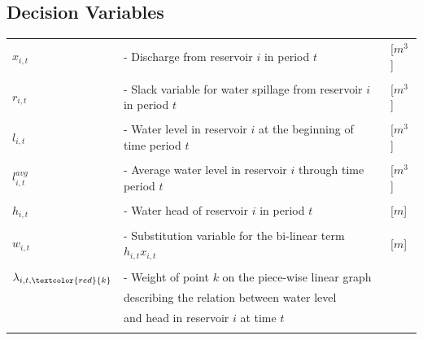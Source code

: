 \subsection*{Decision Variables}
\begin{tabular}{l l l}
    

    $x_{i,t}$   & -\hspace{5mm} Discharge from reservoir $i$ in period $t$  & [$m^3$] \\\\
    
    $r_{i,t}$   & -\hspace{5mm} Slack variable for water spillage from reservoir $i$ in period $t$  & [$m^3$] \\\\
               
    
    $l_{i,t}$   & -\hspace{5mm} Water level in reservoir $i$ at the beginning of time period $t$ & [$m^3$] \\\\
    
    $l^{avg}_{i,t}$ & -\hspace{5mm} Average water level in reservoir $i$ through time period $t$ & [$m^3$] \\\\
    
    $h_{i,t}$   & -\hspace{5mm} Water head of reservoir $i$ in period $t$     & [$m$] \\\\
    
    $w_{i,t}$   & -\hspace{5mm} Substitution variable for the bi-linear term $h_{i,t}x_{i,t}$ & [$m$] \\\\
    
    $\lambda_{i,t,\textcolor{red}{k}}$ & -\hspace{5mm} Weight of point $k$ on the piece-wise linear graph & \\ 
                & \hspace{6.5mm} describing the relation between  water level       & \\
                & \hspace{6.5mm} and head in reservoir $i$ at time $t$              & \\\\ 
                
   

\end{tabular}

